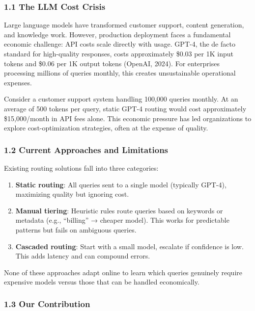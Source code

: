 \documentclass[
]{article}
\providecommand{\tightlist}{%
  \setlength{\itemsep}{0pt}\setlength{\parskip}{0pt}}
\begin{document}
\hypertarget{the-llm-cost-crisis}{%
\subsubsection{1.1 The LLM Cost Crisis}\label{the-llm-cost-crisis}}

Large language models have transformed customer support, content
generation, and knowledge work. However, production deployment faces a
fundamental economic challenge: API costs scale directly with usage.
GPT-4, the de facto standard for high-quality responses, costs
approximately \$0.03 per 1K input tokens and \$0.06 per 1K output tokens
(OpenAI, 2024). For enterprises processing millions of queries monthly,
this creates unsustainable operational expenses.

Consider a customer support system handling 100,000 queries monthly. At
an average of 500 tokens per query, static GPT-4 routing would cost
approximately \$15,000/month in API fees alone. This economic pressure
has led organizations to explore cost-optimization strategies, often at
the expense of quality.

\hypertarget{current-approaches-and-limitations}{%
\subsubsection{1.2 Current Approaches and
Limitations}\label{current-approaches-and-limitations}}

Existing routing solutions fall into three categories:

\begin{enumerate}
\def\labelenumi{\arabic{enumi}.}
\tightlist
\item
  \textbf{Static routing}: All queries sent to a single model (typically
  GPT-4), maximizing quality but ignoring cost.
\item
  \textbf{Manual tiering}: Heuristic rules route queries based on
  keywords or metadata (e.g., ``billing'' → cheaper model). This works
  for predictable patterns but fails on ambiguous queries.
\item
  \textbf{Cascaded routing}: Start with a small model, escalate if
  confidence is low. This adds latency and can compound errors.
\end{enumerate}

None of these approaches adapt online to learn which queries genuinely
require expensive models versus those that can be handled economically.

\hypertarget{our-contribution}{%
\subsubsection{1.3 Our Contribution}\label{our-contribution}}
\end{document}
